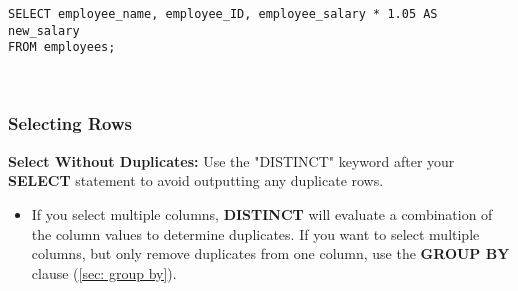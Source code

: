 \begin{verbatim}
SELECT employee_name, employee_ID, employee_salary * 1.05 AS new_salary
FROM employees; 
\end{verbatim}
\

\subsubsection{Selecting Rows}
\textbf{Select Without Duplicates:} Use the "DISTINCT" keyword after your \textcolor{textgray}{\textbf{SELECT}} statement to avoid outputting any duplicate rows.
\begin{itemize}
    \item If you select multiple columns, \textcolor{textgray}{\textbf{DISTINCT}} will evaluate a combination of the column values to determine duplicates. If you want to select multiple columns, but only remove duplicates from one column, use the \textcolor{textgray}{\textbf{GROUP BY}} clause (\ref{sec: group by}).
\end{itemize}



